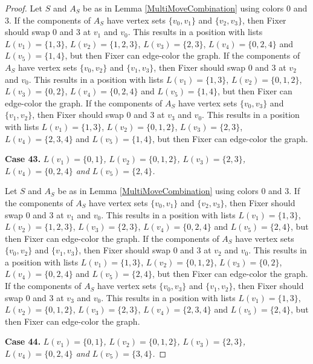 \documentclass[12pt]{amsart}
\theoremstyle{plain}
\theoremstyle{definition}
\theoremstyle{remark}
\begin{document}
\begin{proof}
Let $S$ and $A_S$ be as in Lemma \ref{MultiMoveCombination} using colors $0$ and $3$. If the components of $A_S$ have vertex sets $\{v_0, v_1\}$ and $\{v_2, v_3\}$, then Fixer should swap 0 and 3 at $v_1$ and $v_0$. This results in a position with lists $L(v_1) = \{1, 3\}$, $L(v_2) = \{1, 2, 3\}$, $L(v_3) = \{2, 3\}$, $L(v_4) = \{0, 2, 4\}$ and $L(v_5) = \{1, 4\}$, but then Fixer can edge-color the graph.
If the components of $A_S$ have vertex sets $\{v_0, v_2\}$ and $\{v_1, v_3\}$, then Fixer should swap 0 and 3 at $v_2$ and $v_0$. This results in a position with lists $L(v_1) = \{1, 3\}$, $L(v_2) = \{0, 1, 2\}$, $L(v_3) = \{0, 2\}$, $L(v_4) = \{0, 2, 4\}$ and $L(v_5) = \{1, 4\}$, but then Fixer can edge-color the graph.
If the components of $A_S$ have vertex sets $\{v_0, v_3\}$ and $\{v_1, v_2\}$, then Fixer should swap 0 and 3 at $v_3$ and $v_0$. This results in a position with lists $L(v_1) = \{1, 3\}$, $L(v_2) = \{0, 1, 2\}$, $L(v_3) = \{2, 3\}$, $L(v_4) = \{2, 3, 4\}$ and $L(v_5) = \{1, 4\}$, but then Fixer can edge-color the graph.

\noindent\textbf{Case 43.  }\textit{$L(v_1) = \{0, 1\}$, $L(v_2) = \{0, 1, 2\}$, $L(v_3) = \{2, 3\}$, $L(v_4) = \{0, 2, 4\}$ and $L(v_5) = \{2, 4\}$.}

Let $S$ and $A_S$ be as in Lemma \ref{MultiMoveCombination} using colors $0$ and $3$. If the components of $A_S$ have vertex sets $\{v_0, v_1\}$ and $\{v_2, v_3\}$, then Fixer should swap 0 and 3 at $v_1$ and $v_0$. This results in a position with lists $L(v_1) = \{1, 3\}$, $L(v_2) = \{1, 2, 3\}$, $L(v_3) = \{2, 3\}$, $L(v_4) = \{0, 2, 4\}$ and $L(v_5) = \{2, 4\}$, but then Fixer can edge-color the graph.
If the components of $A_S$ have vertex sets $\{v_0, v_2\}$ and $\{v_1, v_3\}$, then Fixer should swap 0 and 3 at $v_2$ and $v_0$. This results in a position with lists $L(v_1) = \{1, 3\}$, $L(v_2) = \{0, 1, 2\}$, $L(v_3) = \{0, 2\}$, $L(v_4) = \{0, 2, 4\}$ and $L(v_5) = \{2, 4\}$, but then Fixer can edge-color the graph.
If the components of $A_S$ have vertex sets $\{v_0, v_3\}$ and $\{v_1, v_2\}$, then Fixer should swap 0 and 3 at $v_3$ and $v_0$. This results in a position with lists $L(v_1) = \{1, 3\}$, $L(v_2) = \{0, 1, 2\}$, $L(v_3) = \{2, 3\}$, $L(v_4) = \{2, 3, 4\}$ and $L(v_5) = \{2, 4\}$, but then Fixer can edge-color the graph.

\noindent\textbf{Case 44.  }\textit{$L(v_1) = \{0, 1\}$, $L(v_2) = \{0, 1, 2\}$, $L(v_3) = \{2, 3\}$, $L(v_4) = \{0, 2, 4\}$ and $L(v_5) = \{3, 4\}$.}


\end{proof}
\end{document}
